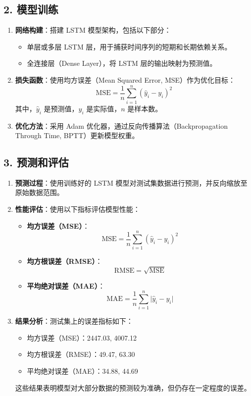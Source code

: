 \documentclass{paper}
\begin{document}
\subsection*{2. 模型训练}
\begin{enumerate}[label=(\alph*)]
    \item \textbf{网络构建}：搭建 LSTM 模型架构，包括以下部分：
    \begin{itemize}
        \item 单层或多层 LSTM 层，用于捕获时间序列的短期和长期依赖关系。
        \item 全连接层（Dense Layer），将 LSTM 层的输出映射为预测值。
    \end{itemize}
    \item \textbf{损失函数}：使用均方误差（Mean Squared Error, MSE）作为优化目标：
    \[
    \text{MSE} = \frac{1}{n} \sum_{i=1}^n (\hat{y}_i - y_i)^2
    \]
    其中，$\hat{y}_i$ 是预测值，$y_i$ 是实际值，$n$ 是样本数。
    \item \textbf{优化方法}：采用 Adam 优化器，通过反向传播算法（Backpropagation Through Time, BPTT）更新模型权重。
\end{enumerate}



\subsection*{3. 预测和评估}
\begin{enumerate}[label=(\alph*)]
    \item \textbf{预测过程}：使用训练好的 LSTM 模型对测试集数据进行预测，并反向缩放至原始数据范围。
    \item \textbf{性能评估}：使用以下指标评估模型性能：
    \begin{itemize}
        \item \textbf{均方误差（MSE）}：
        \[
        \text{MSE} = \frac{1}{n} \sum_{i=1}^n (\hat{y}_i - y_i)^2
        \]
        \item \textbf{均方根误差（RMSE）}：
        \[
        \text{RMSE} = \sqrt{\text{MSE}}
        \]
        \item \textbf{平均绝对误差（MAE）}：
        \[
        \text{MAE} = \frac{1}{n} \sum_{i=1}^n \lvert \hat{y}_i - y_i \rvert
        \]
    \end{itemize}
    \item \textbf{结果分析}：测试集上的误差指标如下：
    \begin{itemize}
        \item 均方误差（MSE）：2447.03, 4007.12
        \item 均方根误差（RMSE）：49.47, 63.30
        \item 平均绝对误差（MAE）：34.88, 44.69
    \end{itemize}
    这些结果表明模型对大部分数据的预测较为准确，但仍存在一定程度的误差。
\end{enumerate}
\end{document}
